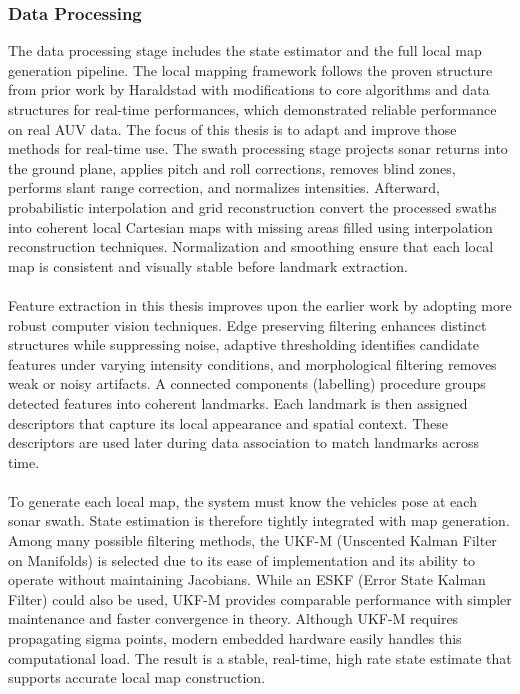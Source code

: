 \subsubsection{Data Processing}
The data processing stage includes the state estimator and the full local map generation pipeline. The local mapping framework follows the proven structure from prior work by Haraldstad \cite{side_scan_sonar_master_thesis} with modifications to core algorithms and data structures for real-time performances, which demonstrated reliable performance on real AUV data. The focus of this thesis is to adapt and improve those methods for real-time use. The swath processing stage projects sonar returns into the ground plane, applies pitch and roll corrections, removes blind zones, performs slant range correction, and normalizes intensities. Afterward, probabilistic interpolation and grid reconstruction convert the processed swaths into coherent local Cartesian maps with missing areas filled using interpolation reconstruction techniques. Normalization and smoothing ensure that each local map is consistent and visually stable before landmark extraction.
\\ \\
Feature extraction in this thesis improves upon the earlier work by adopting more robust computer vision techniques. Edge preserving filtering enhances distinct structures while suppressing noise, adaptive thresholding identifies candidate features under varying intensity conditions, and morphological filtering removes weak or noisy artifacts. A connected components (labelling) procedure groups detected features into coherent landmarks. Each landmark is then assigned descriptors that capture its local appearance and spatial context. These descriptors are used later during data association to match landmarks across time.
\\ \\
To generate each local map, the system must know the vehicles pose at each sonar swath. State estimation is therefore tightly integrated with map generation. Among many possible filtering methods, the UKF-M (Unscented Kalman Filter on Manifolds) is selected due to its ease of implementation and its ability to operate without maintaining Jacobians. While an ESKF (Error State Kalman Filter) could also be used, UKF-M provides comparable performance with simpler maintenance and faster convergence in theory. Although UKF-M requires propagating sigma points, modern embedded hardware easily handles this computational load. The result is a stable, real-time, high rate state estimate that supports accurate local map construction.



